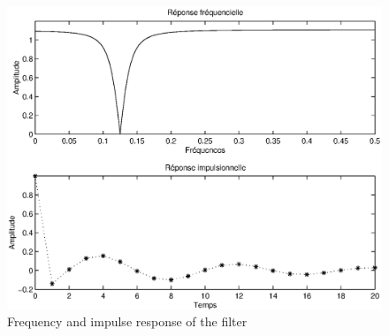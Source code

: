 \begin{figure}[ht] 
    \begin{center}
    \includegraphics[scale=0.5]{images/notch-filter-rep-imp-freq.eps}
    \end{center}
    \caption{Frequency and impulse response of the filter}
              \label{fig-notch-filter-rep-imp-freq}
\end{figure}
 
 
 
